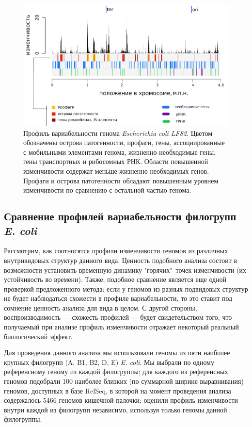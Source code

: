 \begin{figure}[!ht] 
  \center
    \includegraphics[width=\textwidth]{Dissertation/images/complexity/figure5plus2.png}
  \caption{Профиль вариабельности генома \textit{Escherichia coli LF82}. Цветом обозначены острова патогенности, профаги, гены, ассоциированные с мобильными элементами генома, жизненно-необходимые гены, гены транспортных и рибосомных РНК. Области повышенной изменчивости содержат меньше жизненно-необходимых генов. Профаги и острова патогенности обладают повышенным уровнем изменчивости по сравнению с остальной частью генома.}
  \label{img:complexity_lf82} 
\end{figure}


\subsection{Сравнение профилей вариабельности филогрупп \textit{E. coli}}
Рассмотрим, как соотносятся профили изменчивости геномов из различных внутривидовых структур данного вида. Ценность подобного анализа состоит в возможности установить временную динамику "горячих"\ точек изменчивости (их устойчивость во времени). Также, подобное сравнение является еще одной проверкой предложенного метода: если у геномов из разных подвидовых структур не будет наблюдаться схожести в профиле вариабельности, то это ставит под сомнение ценность анализа для вида в целом. С другой стороны, воспроизводимость --- схожесть профилей --- будет свидетельством того, что получаемый при анализе профиль изменчивости отражает некоторый реальный биологический эффект. 

Для проведения данного анализа мы использовали геномы из пяти наиболее крупных филогрупп (A, B1, B2, D, E) \textit{E. coli}. Мы выбрали по одному референсному геному из каждой филогруппы; для каждого из референсных геномов подобрали 100 наиболее близких (по суммарной ширине выравнивания) геномов, доступных в базе RefSeq, в которой на момент проведения анализа содержалось 5466 геномов кишечной палочки; оценили профиль изменчивости внутри каждой из филогрупп независимо, используя только геномы данной филогруппы. 

